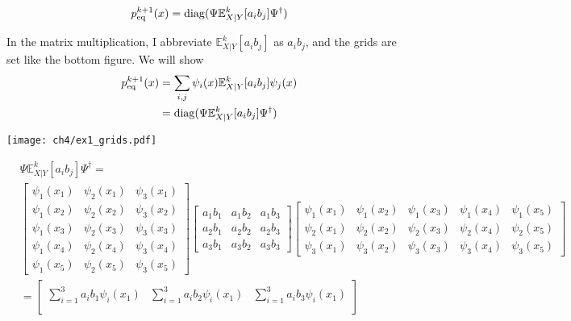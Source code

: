 \begin{definition}
\begin{align}
    p_{\rm eq}^{k+1}(x) = \mathrm{diag}(\Psi \mathbb{E}^k_{X|Y}[a_ib_j] \Psi^{\dagger})
\end{align}
\end{definition}

\begin{example}[$N_v=3$] In the matrix multiplication, I abbreviate $\mathbb{E}^k_{X|Y}[a_ib_j]$ as $a_ib_j$, and the grids are set like the bottom figure. We will show
\begin{align*}
    p_{\rm eq}^{k+1}(x) &=\sum_{i,j} \psi_i(x) \mathbb{E}^k_{X|Y}[a_ib_j] \psi_j(x) \\
    &= \mathrm{diag}(\Psi \mathbb{E}^k_{X|Y}[a_ib_j] \Psi^{\dagger})
\end{align*}
\begin{center}
    \texttt{[image: ch4/ex1\_grids.pdf]}   
\end{center}
\begin{align*} 
&\Psi \mathbb{E}^k_{X|Y}[a_ib_j] \Psi^{\dagger} = \\
&\begin{bmatrix}
    \psi_1(x_1) & \psi_2(x_1) & \psi_3(x_1)  \\
    \psi_1(x_2) & \psi_2(x_2) & \psi_3(x_2) \\
    \psi_1(x_3) & \psi_2(x_3) & \psi_3(x_3)  \\
    \psi_1(x_4) & \psi_2(x_4) & \psi_3(x_4)  \\
    \psi_1(x_5) & \psi_2(x_5) & \psi_3(x_5)  
\end{bmatrix}
\begin{bmatrix}
    a_1 b_1 & a_1 b_2 & a_1 b_3  \\
    a_2 b_1 & a_2 b_2 & a_2 b_3 \\
    a_3 b_1 & a_3 b_2 & a_3 b_3
\end{bmatrix}
\begin{bmatrix}
    \psi_1(x_1) & \psi_1(x_2) & \psi_1(x_3) & \psi_1(x_4) & \psi_1(x_5) \\
    \psi_2(x_1) & \psi_2(x_2) & \psi_2(x_3) & \psi_2(x_4) & \psi_2(x_5) \\
    \psi_3(x_1) & \psi_3(x_2) & \psi_3(x_3) & \psi_3(x_4) & \psi_3(x_5) 
\end{bmatrix} \\
&=\begin{bmatrix}
    \sum_{i=1}^{3}a_i b_1 \psi_i(x_1) & \sum_{i=1}^{3}a_i b_2 \psi_i(x_1) & \sum_{i=1}^{3}a_i b_3 \psi_i(x_1) \\

\end{bmatrix}
\end{align*}
\end{example}

